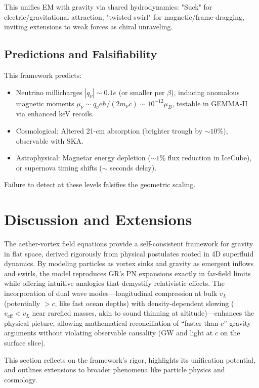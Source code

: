 \documentclass{article}
\begin{document}
This unifies EM with gravity via shared hydrodynamics: "Suck" for electric/gravitational attraction, "twisted swirl" for magnetic/frame-dragging, inviting extensions to weak forces as chiral unraveling.

\subsection{Predictions and Falsifiability}

This framework predicts:
\begin{itemize}
  \item Neutrino millicharges $|q_\nu| \sim 0.1 e$ (or smaller per $\beta$), inducing anomalous magnetic moments $\mu_\nu \sim q_\nu e \hbar / (2 m_\nu c) \sim 10^{-12} \mu_B$, testable in GEMMA-II via enhanced keV recoils.
  \item Cosmological: Altered 21-cm absorption (brighter trough by $\sim 10\%$), observable with SKA.
  \item Astrophysical: Magnetar energy depletion ($\sim 1\%$ flux reduction in IceCube), or supernova timing shifts ($\sim$ seconds delay).
\end{itemize}

Failure to detect at these levels falsifies the geometric scaling.

\section{Discussion and Extensions}

The aether-vortex field equations provide a self-consistent framework for gravity in flat space, derived rigorously from physical postulates rooted in 4D superfluid dynamics. By modeling particles as vortex sinks and gravity as emergent inflows and swirls, the model reproduces GR's PN expansions exactly in far-field limits while offering intuitive analogies that demystify relativistic effects. The incorporation of dual wave modes---longitudinal compression at bulk $v_L$ (potentially $>c$, like fast ocean depths) with density-dependent slowing ($v_{\text{eff}} < v_L$ near rarefied masses, akin to sound thinning at altitude)---enhances the physical picture, allowing mathematical reconciliation of ``faster-than-$c$'' gravity arguments without violating observable causality (GW and light at $c$ on the surface slice).

This section reflects on the framework's rigor, highlights its unification potential, and outlines extensions to broader phenomena like particle physics and cosmology.
\end{document}

